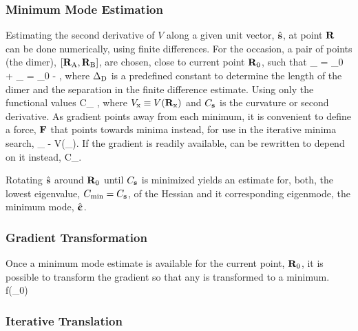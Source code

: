 \subsubsection{Minimum Mode Estimation}
Estimating the second derivative of $V$ along a given unit vector, $\hat{{\mathrm{\mathbf{\bm{s}}}}}$, at point ${\mathrm{\mathbf{\bm{R}}}}$ can be done numerically, using finite differences.
For the occasion, a pair of points (the dimer), $[{\mathrm{\mathbf{\bm{R}}}}_\text{A}, {\mathrm{\mathbf{\bm{R}}}}_\text{B}]$, are chosen, close to current point ${\mathrm{\mathbf{\bm{R}}}}_0$, such that
\vR_ = \vR_0 + \Dsep \uvs \quad {} \quad \vR_ = \vR_0  - \Dsep \uvs,
\eeq
where $\Delta_\text{D}$ is a predefined constant to determine the length of the dimer and the separation in the finite difference estimate.
Using only the functional values
C_\vs \equiv {} \approx {},
\eeq
where $V_\text{x} \equiv V({\mathrm{\mathbf{\bm{R}}}}_\text{x})$ and $C_{\mathrm{\mathbf{\bm{s}}}}$ is the curvature or second derivative.
As gradient points away from each minimum, it is convenient to define a force, ${\mathrm{\mathbf{\bm{F}}}}$ that points towards minima instead, for use in the iterative minima search,
\vF_ \equiv - \nabla V(\vR_).
\eeq
If the gradient is readily available,  can be rewritten to depend on it instead,
C_\vs \approx {}.
\eeq

Rotating $\hat{{\mathrm{\mathbf{\bm{s}}}}}$ around ${\mathrm{\mathbf{\bm{R}}}}_0$ until $C_{\mathrm{\mathbf{\bm{s}}}}$ is minimized yields an estimate for, both, the lowest eigenvalue, $C_\text{min} = C_{\mathrm{\mathbf{\bm{s}}}}$, of the Hessian and it corresponding eigenmode, the minimum mode, $\hat{{\mathrm{\mathbf{\bm{\upepsilon}}}}}$.




\incomplete

\subsubsection{Gradient Transformation}
Once a minimum mode estimate is available for the current point, ${\mathrm{\mathbf{\bm{R}}}}_0$, it is possible to transform the gradient so that any  is transformed to a minimum.
\nabla{}f(\vR_0)
\eeq


\incomplete

\subsubsection{Iterative Translation}

\incomplete
